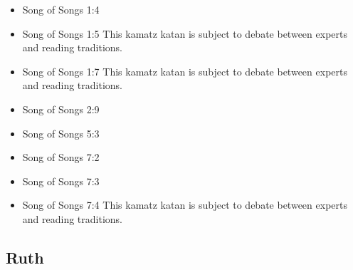 \documentclass[14pt]{article}
\begin{document}
\begin{multicols}{2}\begin{itemize}
		
	\item Song of Songs 1:4
	
	\item Song of Songs 1:5 This kamatz katan is subject to debate between experts and reading traditions.
	
	\item Song of Songs 1:7 This kamatz katan is subject to debate between experts and reading traditions.
	
	\item Song of Songs 2:9
	
	\item Song of Songs 5:3
	
	\item Song of Songs 7:2
	
	\item Song of Songs 7:3
	
	\item Song of Songs 7:4 This kamatz katan is subject to debate between experts and reading traditions.
	
\end{itemize}\end{multicols}

\subsection{Ruth}
\end{document}
